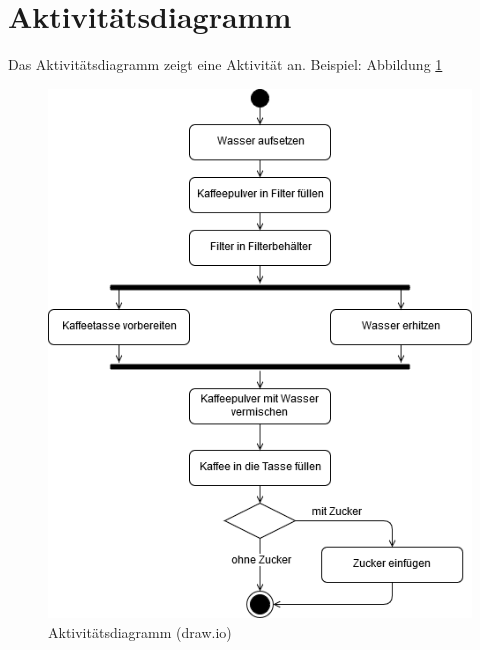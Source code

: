 \documentclass[a4paper, titlepage]{scrartcl}
\begin{document}
    \section{Aktivitätsdiagramm}
    Das Aktivitätsdiagramm zeigt eine Aktivität an. 
    Beispiel: Abbildung \ref{AktivitaetsdiagrammDrawIO}
    \begin{figure}
        \includegraphics[width=\textwidth]{Aktivitaetsdiagramm1a.png}
        \caption{Aktivitätsdiagramm (draw.io)}
        \label{AktivitaetsdiagrammDrawIO}
    \end{figure}
    
\end{document}
